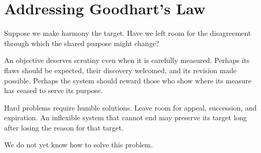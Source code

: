 \chapter{Addressing Goodhart's Law}
\label{short:addressing-goodharts-law}

Suppose we make harmony the target. Have we left room for the disagreement
through which the shared purpose might change?

An objective deserves scrutiny even when it is carefully measured. Perhaps
its flaws should be expected, their discovery welcomed, and its revision
made possible. Perhaps the system should reward those who show where its
measure has ceased to serve its purpose.

Hard problems require humble solutions. Leave room for appeal, succession,
and expiration. An inflexible system that cannot end may preserve its target
long after losing the reason for that target.

We do not yet know how to solve this problem.

